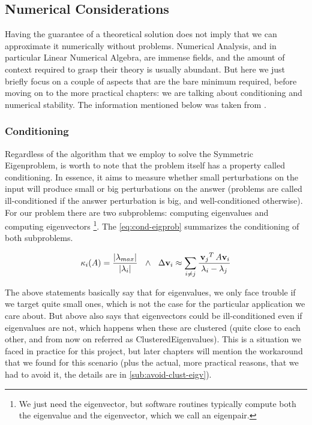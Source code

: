 \subsection{Numerical Considerations}

Having the guarantee of a theoretical solution does not imply that we
can approximate it numerically without problems. Numerical Analysis,
and in particular Linear Numerical 
Algebra, are immense fields, and the amount of context required to grasp
their theory is usually abundant. But here we just briefly focus on a couple of
aspects that are the bare minimum required, before moving on to the more
practical chapters: we are talking about conditioning and numerical
stability. The information mentioned below was taken from
\cite{bindel09}. \\ 

\subsubsection{Conditioning}
Regardless of the algorithm that we employ to solve the Symmetric
Eigenproblem, is worth to note that the problem itself has a property
called conditioning. In essence, it aims to measure whether small
perturbations on the input will produce small or big perturbations on the
answer (problems are called ill-conditioned if the answer perturbation
is big, and well-conditioned otherwise). For our problem there are two subproblems:
computing eigenvalues and computing eigenvectors \footnote{We
just need the eigenvector, but software routines typically compute both the
eigenvalue and the eigenvector, which we call an eigenpair.}. The
\cref{eq:cond-eigprob} summarizes the conditioning of both subproblems.

\begin{equation}
  \label{eq:cond-eigprob}
  \kappa_{i}(A) = \dfrac{\left\lvert \lambda_{max} \right\vert}{\left\lvert \lambda_i \right\vert}
  \,\,\,\,\land\,\,\,\,
  \Delta \mathbf{v}_i \approx \sum\limits_{\tiny{i \ne j}}
  \dfrac{\,{\mathbf{v}_j}^{T}\, A \mathbf{v}_i}{\lambda_i - \lambda_j}  
\end{equation}
\joinbelow{1cm}

The above statements basically say that for eigenvalues, we only face
trouble if we target quite small ones, which is not the case for the
particular application we care about. But above also says that
eigenvectors could be ill-conditioned even if eigenvalues are not,
which happens when these are clustered (quite close to each
other, and from now on referred as \gls{ClusteredEigenvalues}). This
is a situation we faced in practice for this project, but 
later chapters will mention the workaround that we found for this
scenario (plus the actual, more practical reasons, that we had to avoid
it, the details are in \cref{sub:avoid-clust-eigv}). 

